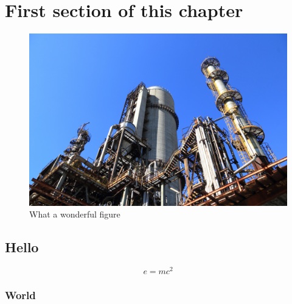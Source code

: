 \section{First section of this chapter}

\begin{figure}[h]
    \includegraphics[width=\linewidth]{figures/sample.jpg}
    \caption{What a wonderful figure}
    \label{fig:sample}
\end{figure}

\subsection{Hello}

\begin{equation}
    e=mc^2
\end{equation}

\subsubsection{World}
